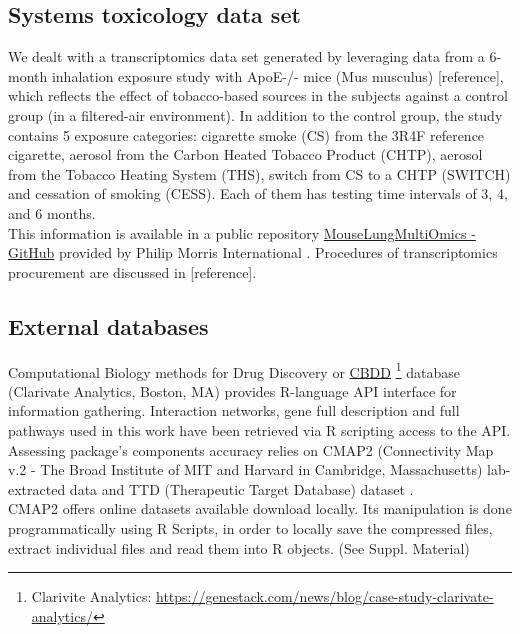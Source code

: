 \subsection{Systems toxicology data set}
We dealt with a transcriptomics data set generated by leveraging data from a 6-month inhalation exposure study with ApoE-/- mice (Mus musculus) [reference], which reflects the effect of tobacco-based sources in the subjects against a control group (in a filtered-air environment). In addition to the control group, the study contains 5 exposure categories: cigarette smoke (CS) from the 3R4F reference cigarette, aerosol from the Carbon Heated Tobacco Product (CHTP), aerosol from the Tobacco Heating System (THS), switch from CS to a CHTP (SWITCH) and cessation of smoking (CESS). Each of them has testing time intervals of 3, 4, and 6 months.
\\

This information is available in a public repository \href{https://github.com/philipmorrisintl/MouseLungMultiOmics}{MouseLungMultiOmics - GitHub} provided by Philip Morris International \cite{Titz2020Multi-omicsSmoke}. Procedures of transcriptomics procurement are discussed in [reference].
\\

\subsection{External databases}
\label{section:external-db}
Computational Biology methods for Drug Discovery or \href{https://genestack.com/news/blog/case-study-clarivate-analytics/}{CBDD} \footnote{Clarivite Analytics: \url{https://genestack.com/news/blog/case-study-clarivate-analytics/}} database (Clarivate Analytics, Boston, MA) provides R-language API interface for information gathering. Interaction networks, gene full description and full pathways used in this work have been retrieved via R scripting access to the API.
\\

Assessing package’s components accuracy relies on CMAP2 (Connectivity Map v.2 - The Broad Institute of MIT and Harvard in Cambridge, Massachusetts) lab-extracted data \cite{Subramanian2017AProfiles} and TTD (Therapeutic Target Database) dataset \cite{Wang2020TherapeuticTherapeutics}.
\\

CMAP2 offers online datasets available download locally. Its manipulation is done programmatically using R Scripts, in order to locally save the compressed files, extract individual files and read them into R objects. (See Suppl. Material)
\\

